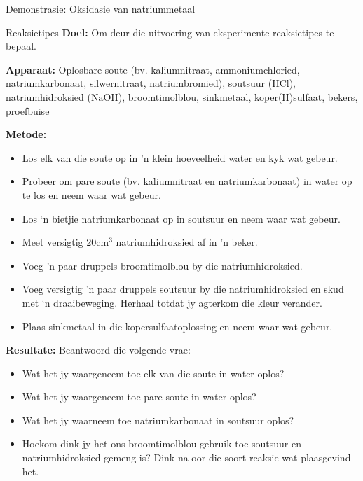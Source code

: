 {{\begin{g_experiment}{Demonstrasie: Oksidasie van natriummetaal}
\end{g_experiment}
	\par
\label{m38719*eip-611}
            \begin{g_experiment}{Reaksietipes}
            \nopagebreak
            \label{m38719*eip-190}\noindent{}\textbf{Doel: }\newline
   Om deur die uitvoering van eksperimente reaksietipes te bepaal.
\par 
\label{m38719*eip-1901}\noindent{}\textbf{Apparaat: }\newline
Oplosbare soute (bv. kaliumnitraat, ammoniumchloried, natriumkarbonaat, silwernitraat, natriumbromied), soutsuur ($\text{HCl}$), natriumhidroksied ($\text{NaOH}$), broomtimolblou, sinkmetaal, koper(II)sulfaat, bekers, proefbuise
\par 
\label{m38719*eip-1902}\noindent{}\textbf{Metode: }\label{m38719*id6231}\begin{itemize}[noitemsep]
            \item Los elk van die soute op in 'n klein hoeveelheid water en kyk wat gebeur.
\item Probeer om pare soute (bv. kaliumnitraat en natriumkarbonaat) in water op te los en neem waar wat gebeur.
\item Los ‘n bietjie natriumkarbonaat op in soutsuur en neem waar wat gebeur.
\item Meet versigtig $20{\text{cm}}^{3}$ natriumhidroksied af in 'n beker. 
\item Voeg 'n paar druppels broomtimolblou by die natriumhidroksied.
\item Voeg versigtig 'n paar druppels soutsuur by die natriumhidroksied en skud met ‘n draaibeweging. Herhaal totdat jy agterkom die kleur verander.
\item Plaas sinkmetaal in die kopersulfaatoplossing en neem waar wat gebeur.
\end{itemize}
\par 
\label{m38719*eip-1903}\noindent{}\textbf{Resultate: }\newline
    Beantwoord die volgende vrae:
\label{m38719*id6144}\begin{itemize}[noitemsep]
\item Wat het jy waargeneem toe elk van die soute in water oplos?
\item Wat het jy waargeneem toe pare soute in water oplos?
\item Wat het jy waarneem toe natriumkarbonaat in soutsuur oplos?
\item Hoekom dink jy het ons broomtimolblou gebruik toe soutsuur en natriumhidroksied gemeng is? Dink na oor die soort reaksie wat plaasgevind het.

\end{itemize}
\end{g_experiment}}}
